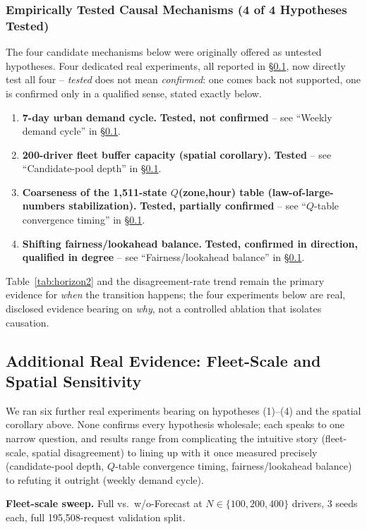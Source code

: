 \documentclass[10pt,twocolumn,a4paper]{article}
\begin{document}
\subsubsection{Empirically Tested Causal Mechanisms (4 of 4 Hypotheses Tested)}
The four candidate mechanisms below were originally offered as untested
hypotheses. Four dedicated real experiments, all reported in
\S\ref{sec:additional}, now directly test all four -- \emph{tested} does
not mean \emph{confirmed}: one comes back not supported, one is confirmed
only in a qualified sense, stated exactly below.
\begin{enumerate}
\item \textbf{7-day urban demand cycle.} \textbf{Tested, not confirmed} --
see ``Weekly demand cycle'' in \S\ref{sec:additional}.
\item \textbf{200-driver fleet buffer capacity (spatial corollary).}
\textbf{Tested} -- see ``Candidate-pool depth'' in \S\ref{sec:additional}.
\item \textbf{Coarseness of the 1{,}511-state $Q$(zone,hour) table
(law-of-large-numbers stabilization).} \textbf{Tested, partially
confirmed} -- see ``$Q$-table convergence timing'' in \S\ref{sec:additional}.
\item \textbf{Shifting fairness/lookahead balance.} \textbf{Tested,
confirmed in direction, qualified in degree} -- see ``Fairness/lookahead
balance'' in \S\ref{sec:additional}.
\end{enumerate}
Table~\ref{tab:horizon2} and the disagreement-rate trend remain the primary
evidence for \emph{when} the transition happens; the four experiments
below are real, disclosed evidence bearing on \emph{why}, not a controlled
ablation that isolates causation.

\subsection{Additional Real Evidence: Fleet-Scale and Spatial Sensitivity}
\label{sec:additional}
We ran six further real experiments bearing on hypotheses (1)--(4) and the
spatial corollary above. None confirms every hypothesis wholesale; each
speaks to one narrow question, and results range from complicating the
intuitive story (fleet-scale, spatial disagreement) to lining up with it
once measured precisely (candidate-pool depth, $Q$-table convergence
timing, fairness/lookahead balance) to refuting it outright (weekly
demand cycle).

\textbf{Fleet-scale sweep.} Full vs.\ w/o-Forecast at $N\in\{100,200,400\}$
drivers, 3 seeds each, full 195{,}508-request validation split.
\end{document}
